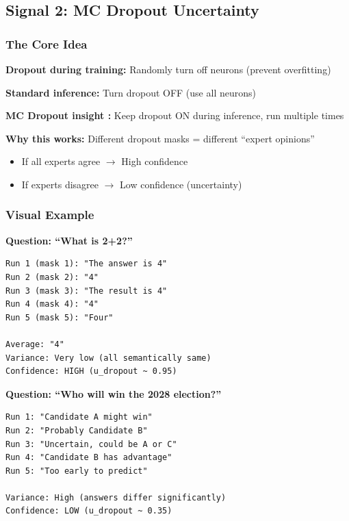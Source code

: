 \documentclass[12pt,a4paper]{article}
\theoremstyle{definition}
\begin{document}
\subsection{Signal 2: MC Dropout Uncertainty}

\subsubsection{The Core Idea}

\begin{intuitionbox}
\textbf{Dropout during training:} Randomly turn off neurons (prevent overfitting)

\textbf{Standard inference:} Turn dropout OFF (use all neurons)

\textbf{MC Dropout insight \cite{gal2016dropout}:} Keep dropout ON during inference, run multiple times

\textbf{Why this works:} Different dropout masks = different ``expert opinions''
\begin{itemize}
    \item If all experts agree $\rightarrow$ High confidence
    \item If experts disagree $\rightarrow$ Low confidence (uncertainty)
\end{itemize}
\end{intuitionbox}

\subsubsection{Visual Example}

\begin{examplebox}
\textbf{Question: ``What is 2+2?''}

\begin{verbatim}
Run 1 (mask 1): "The answer is 4"
Run 2 (mask 2): "4"  
Run 3 (mask 3): "The result is 4"
Run 4 (mask 4): "4"
Run 5 (mask 5): "Four"

Average: "4"
Variance: Very low (all semantically same)
Confidence: HIGH (u_dropout ~ 0.95)
\end{verbatim}

\textbf{Question: ``Who will win the 2028 election?''}

\begin{verbatim}
Run 1: "Candidate A might win"
Run 2: "Probably Candidate B"
Run 3: "Uncertain, could be A or C"
Run 4: "Candidate B has advantage"
Run 5: "Too early to predict"

Variance: High (answers differ significantly)
Confidence: LOW (u_dropout ~ 0.35)
\end{verbatim}
\end{examplebox}
\end{document}
